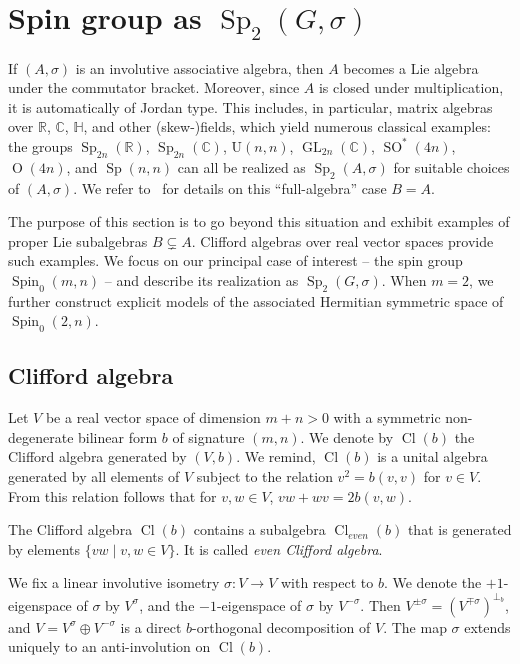 \documentclass[a4paper,oneside,11pt]{amsart}
\DeclareMathOperator{\Sp}{Sp}
\DeclareMathOperator{\GL}{GL}
\DeclareMathOperator{\OO}{O}
\DeclareMathOperator{\SO}{SO}
\DeclareMathOperator{\Cl}{Cl}
\DeclareMathOperator{\Spin}{Spin}
\newcommand{\R}{\mathbb R}
\newcommand{\CC}{\mathbb C}
\newcommand{\HH}{\mathbb H}
\theoremstyle{plain}
\theoremstyle{definition}
\theoremstyle{remark}
\newcommand{\defin}{\emph}
\begin{document}
\section{Spin group as \texorpdfstring{$\Sp_2(G,\sigma)$}{Sp2(G,sigma)}}\label{Clifford}

If $(A,\sigma)$ is an involutive associative algebra, then $A$ becomes a Lie algebra under the commutator bracket. Moreover, since $A$ is closed under multiplication, it is automatically of Jordan type. This includes, in particular, matrix algebras over $\R$, $\CC$, $\HH$, and other (skew-)fields, which yield numerous classical examples: the groups $\Sp_{2n}(\R)$, $\Sp_{2n}(\CC)$, $\mathrm{U}(n,n)$, $\GL_{2n}(\CC)$, $\SO^*(4n)$, $\OO(4n)$, and $\Sp(n,n)$ can all be realized as $\Sp_2(A,\sigma)$ for suitable choices of $(A,\sigma)$. We refer to~\cite{ABRRW} for details on this ``full-algebra'' case $B=A$.

The purpose of this section is to go beyond this situation and exhibit examples of proper Lie subalgebras $B\subsetneq A$. Clifford algebras over real vector spaces provide such examples. We focus on our principal case of interest -- the spin group $\Spin_0(m,n)$ -- and describe its realization as $\Sp_2(G,\sigma)$. When $m=2$, we further construct explicit models of the associated Hermitian symmetric space of $\Spin_0(2,n)$.


\subsection{Clifford algebra}\label{ex:Clifford}
    
    Let $V$ be a real vector space of dimension $m+n>0$ with a symmetric non-degenerate bilinear form $b$ of signature $(m,n)$. We denote by $\Cl(b)$ the Clifford algebra generated by $(V,b)$. We remind, $\Cl(b)$ is a unital algebra generated by all elements of $V$ subject to the relation $v^2=b(v,v)$ for $v\in V$. From this relation follows that for $v,w\in V$, $vw+wv=2b(v,w)$.

    The Clifford algebra $\Cl(b)$ contains a subalgebra $\Cl_{even}(b)$ that is generated by elements $\{vw\mid v,w\in V\}$. It is called \defin{even Clifford algebra}.

    We fix a linear involutive isometry $\sigma\colon V\to V$ with respect to $b$. We denote the $+1$-eigenspace of $\sigma$ by $V^\sigma$, and the $-1$-eigenspace of $\sigma$ by $V^{-\sigma}$. Then $V^{\pm\sigma}=(V^{\mp\sigma})^{\perp_b}$, and $V=V^\sigma\oplus V^{-\sigma}$ is a direct $b$-orthogonal decomposition of $V$. The map $\sigma$ extends uniquely to an anti-involution on $\Cl(b)$.
\end{document}
